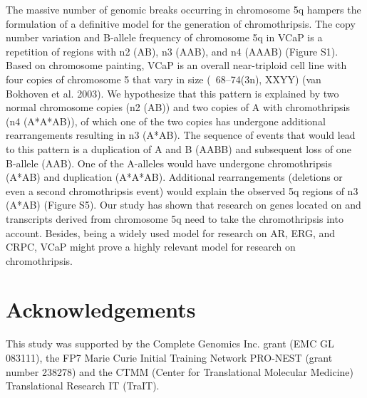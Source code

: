 The massive number of genomic breaks occurring in chromosome 5q hampers the formulation of a definitive model for the generation of chromothripsis. The copy number variation and B-allele frequency of chromosome 5q in VCaP is a repetition of regions with n2 (AB), n3 (AAB), and n4 (AAAB) (Figure S1). Based on chromosome painting, VCaP is an overall near-triploid cell line with four copies of chromosome 5 that vary in size (~68–74(3n), XXYY) (van Bokhoven et al. 2003). We hypothesize that this pattern is explained by two normal chromosome copies (n2 (AB)) and two copies of A with chromothripsis (n4 (A*A*AB)), of which one of the two copies has undergone additional rearrangements resulting in n3 (A*AB). The sequence of events that would lead to this pattern is a duplication of A and B (AABB) and subsequent loss of one B-allele (AAB). One of the A-alleles would have undergone chromothripsis (A*AB) and duplication (A*A*AB). Additional rearrangements (deletions or even a second chromothripsis event) would explain the observed 5q regions of n3 (A*AB) (Figure S5). Our study has shown that research on genes located on and transcripts derived from chromosome 5q need to take the chromothripsis into account. Besides, being a widely used model for research on AR, ERG, and CRPC, VCaP might prove a highly relevant model for research on chromothripsis.

\section*{Acknowledgements}
This study was supported by the Complete Genomics Inc. grant (EMC GL 083111), the FP7 Marie Curie Initial Training Network PRO-NEST (grant number 238278) and the CTMM (Center for Translational Molecular Medicine) Translational Research IT (TraIT). \cite{ireport}

%




